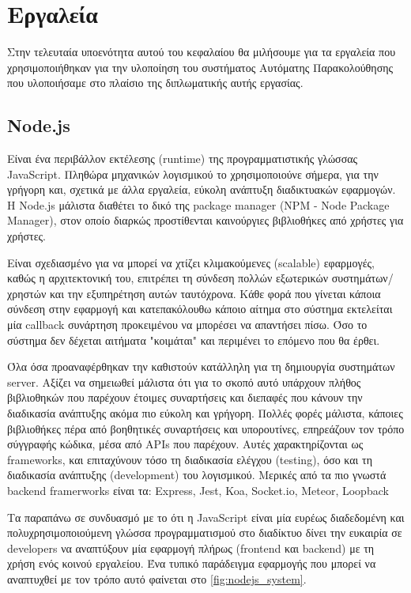 \section{Εργαλεία}
\label{section:tools}

Στην τελευταία υποενότητα αυτού του κεφαλαίου θα μιλήσουμε για τα εργαλεία που χρησιμοποιήθηκαν
για την υλοποίηση του συστήματος Αυτόματης Παρακολούθησης που υλοποιήσαμε στο πλαίσιο της διπλωματικής
αυτής εργασίας.

\subsection{Node.js}
\label{subsec:nodejs}

Είναι ένα περιβάλλον εκτέλεσης (runtime) της προγραμματιστικής γλώσσας JavaScript.
Πληθώρα μηχανικών λογισμικού το χρησιμοποιούνε σήμερα, για την γρήγορη και, σχετικά με άλλα εργαλεία,
εύκολη ανάπτυξη διαδικτυακών εφαρμογών. Η Node.js μάλιστα διαθέτει το δικό της package manager
(ΝPM - Node Package Manager), στον οποίο διαρκώς προστίθενται καινούργιες βιβλιοθήκες
από χρήστες για χρήστες. 

Είναι σχεδιασμένο για να μπορεί να χτίζει κλιμακούμενες (scalable) εφαρμογές, καθώς η αρχιτεκτονική του,
επιτρέπει τη σύνδεση πολλών εξωτερικών συστημάτων/χρηστών και την εξυπηρέτηση αυτών ταυτόχρονα. Κάθε φορά που γίνεται κάποια σύνδεση στην εφαρμογή και κατεπακόλουθω
κάποιο αίτημα στο σύστημα εκτελείται μία callback συνάρτηση προκειμένου να μπορέσει να απαντήσει πίσω.
Όσο το σύστημα δεν δέχεται αιτήματα "κοιμάται" και περιμένει το επόμενο που θα έρθει.

Όλα όσα προαναφέρθηκαν την καθιστούν κατάλληλη για τη δημιουργία συστημάτων server. Αξίζει να σημειωθεί μάλιστα ότι για το σκοπό
αυτό υπάρχουν πλήθος βιβλιοθηκών που παρέχουν έτοιμες συναρτήσεις και διεπαφές που κάνουν την διαδικασία ανάπτυξης ακόμα πιο εύκολη
και γρήγορη. Πολλές φορές μάλιστα, κάποιες βιβλιοθήκες πέρα από βοηθητικές συναρτήσεις και υπορουτίνες, επηρεάζουν τον τρόπο
σύγγραφής κώδικα, μέσα από APIs που παρέχουν. Αυτές χαρακτηρίζονται ως frameworks, και επιταχύνουν τόσο τη διαδικασία
ελέγχου (testing), όσο και τη διαδικασία ανάπτυξης (development) του λογισμικού. Μερικές από τα πιο γνωστά
backend framerworks είναι τα: Express, Jest, Koa, Socket.io, Meteor, Loopback

Τα παραπάνω σε συνδυασμό με το ότι η JavaScript είναι μία ευρέως διαδεδομένη και πολυχρησιμοποιούμενη γλώσσα
προγραμματισμού στο διαδίκτυο δίνει την ευκαιρία σε developers να αναπτύξουν μία εφαρμογή πλήρως
(frontend και backend) με τη χρήση ενός κοινού εργαλείου. Ένα τυπικό παράδειγμα εφαρμογής που μπορεί να
αναπτυχθεί με τον τρόπο αυτό φαίνεται στο \autoref{fig:nodejs_system}.

